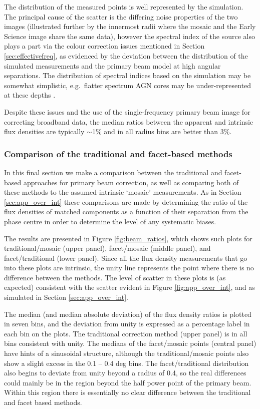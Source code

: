 \documentclass[usenatbib,usedcolumn]{mnras}
\begin{document}
The distribution of the measured points is well represented by the simulation. The principal cause of the scatter is the differing noise properties of the two images (illustrated further by the innermost radii where the mosaic and the Early Science image share the same data), however the spectral index of the source also plays a part via the colour correction issues mentioned in Section \ref{sec:effectivefreq}, as evidenced by the deviation between the distribution of the simulated measurements and the primary beam model at high angular separations. The distribution of spectral indices based on the \citet{wilman2008} simulation may be somewhat simplistic, e.g.~flatter spectrum AGN cores may be under-represented at these depths \citep{whittam2017}.

Despite these issues and the use of the single-frequency primary beam image for correcting broadband data, the median ratios between the apparent and intrinsic flux densities are typically $\sim$1\% and in all radius bins are better than 3\%. 

\subsubsection{Comparison of the traditional and facet-based methods}

In this final section we make a comparison between the traditional and facet-based approaches for primary beam correction, as well as comparing both of these methods to the assumed-intrinsic `mosaic' measurements. As in Section \ref{sec:app_over_int} these comparisons are made by determining the ratio of the flux densities of matched components as a function of their separation from the phase centre in order to determine the level of any systematic biases.

The results are presented in Figure \ref{fig:beam_ratios}, which shows such plots for traditional/mosaic (upper panel), facet/mosaic (middle panel), and facet/traditional (lower panel). Since all the flux density measurements that go into these plots are intrinsic, the unity line represents the point where there is no difference between the methods. The level of scatter in these plots is (as expected) consistent with the scatter evident in Figure \ref{fig:app_over_int}, and as simulated in Section \ref{sec:app_over_int}. 

The median (and median absolute deviation) of the flux density ratios is plotted in seven bins, and the deviation from unity is expressed as a percentage label in each bin on the plots. The traditional correction method (upper panel) is in all bins consistent with unity. The medians of the facet/mosaic points (central panel) have hints of a sinusoidal structure, although the traditional/mosaic points also show a slight excess in the 0.1 -- 0.4 deg bins. The facet/traditional distribution also begins to deviate from unity beyond a radius of 0.4, so the real differences could mainly be in the region beyond the half power point of the primary beam. Within this region there is essentially no clear difference between the traditional and facet based methods. 
\end{document}

